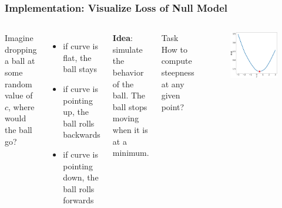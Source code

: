 \documentclass{beamer}
\begin{document}
\begin{frame}
\frametitle{Implementation: Visualize Loss of Null Model}

\begin{columns}


Imagine dropping a ball at some random value of $c$, where would the ball go?
\begin{itemize}
\item if curve is flat, the ball stays
\item if curve is pointing up, the ball rolls backwards
\item if curve is pointing down, the ball rolls forwards
\end{itemize}

\textbf{Idea}: simulate the behavior of the ball. The ball stops moving when it is at a minimum.

\begin{alertblock}{Task}
How to compute steepness at any given point?
 \end{alertblock}


\begin{figure}
\includegraphics[width=\textwidth]{../figures/null_loss.png}
\end{figure}

\end{columns}

\end{frame}
\end{document}
